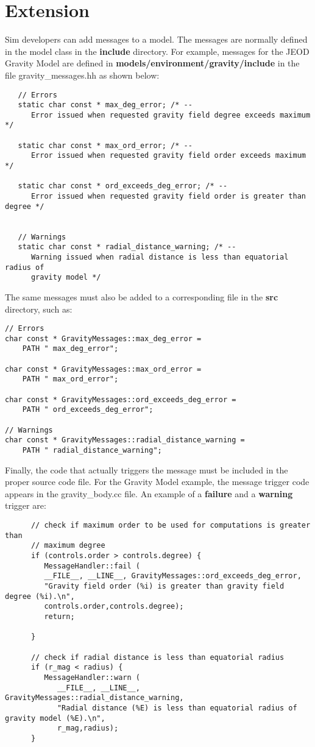 \section{Extension}
Sim developers can add messages to a model. The messages are normally defined
in the model class in the {\bf include} directory.  For example,
messages for the JEOD Gravity Model are defined in {\bf models/environment/gravity/include}
in the file gravity\_messages.hh as shown below:
\begin{verbatim}
   // Errors
   static char const * max_deg_error; /* --
      Error issued when requested gravity field degree exceeds maximum */

   static char const * max_ord_error; /* --
      Error issued when requested gravity field order exceeds maximum */

   static char const * ord_exceeds_deg_error; /* --
      Error issued when requested gravity field order is greater than degree */


   // Warnings
   static char const * radial_distance_warning; /* --
      Warning issued when radial distance is less than equatorial radius of
      gravity model */

\end{verbatim}

The same messages must also be added to a corresponding file in the 
{\bf src} directory, such as:
\begin{verbatim}
// Errors
char const * GravityMessages::max_deg_error =
    PATH " max_deg_error";

char const * GravityMessages::max_ord_error =
    PATH " max_ord_error";

char const * GravityMessages::ord_exceeds_deg_error =
    PATH " ord_exceeds_deg_error";

// Warnings
char const * GravityMessages::radial_distance_warning =
    PATH " radial_distance_warning";
\end{verbatim}

Finally, the code that actually triggers the message must be included
in the proper source code file.  For the Gravity Model example, the
message trigger code appears in the gravity\_body.cc file.  An
example of a {\bf failure} and a {\bf warning} trigger are:
\begin{verbatim}
      // check if maximum order to be used for computations is greater than
      // maximum degree
      if (controls.order > controls.degree) {
         MessageHandler::fail (
         __FILE__, __LINE__, GravityMessages::ord_exceeds_deg_error,
         "Gravity field order (%i) is greater than gravity field degree (%i).\n",
         controls.order,controls.degree);
         return;

      }

      // check if radial distance is less than equatorial radius
      if (r_mag < radius) {
         MessageHandler::warn (
            __FILE__, __LINE__, GravityMessages::radial_distance_warning,
            "Radial distance (%E) is less than equatorial radius of gravity model (%E).\n",
            r_mag,radius);
      }

\end{verbatim}

